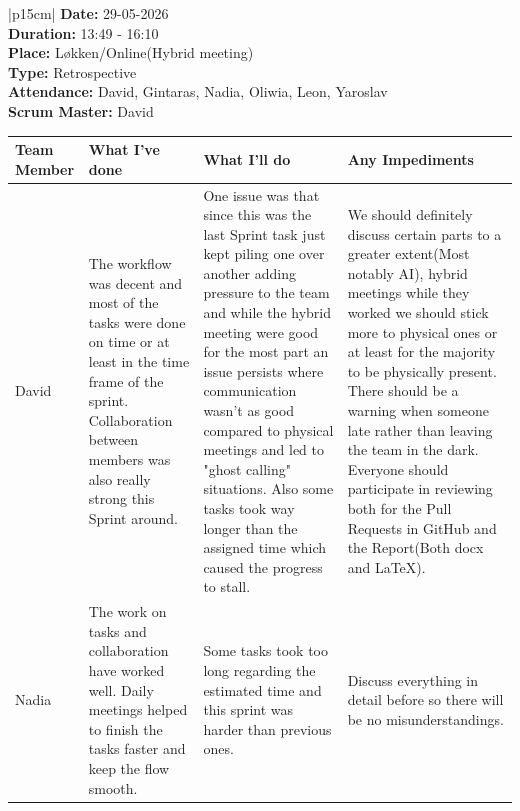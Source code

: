 \begin{table}[H]
    \centering
    \begin{tabular}{|p{15cm}|}   
        \hline
        \textbf{Date:}  29-05-2026 \\
        \textbf{Duration:}  13:49 - 16:10 \\
        \textbf{Place:}  Løkken/Online(Hybrid meeting) \\
        \textbf{Type:} Retrospective \\
        \textbf{Attendance:}  David, Gintaras, Nadia, Oliwia, Leon, Yaroslav\\
        \textbf{Scrum Master:}  David 
        \begin{table}[H]
            \begin{tabular}{|p{1.75cm}|p{4cm}|p{4cm}|p{4cm}|}
                \hline
                \cellcolor[HTML]{BFBFBF}  \textbf{Team Member} & \cellcolor[HTML]{BFBFBF}  \textbf{What I've done} & \cellcolor[HTML]{BFBFBF}  \textbf{What I'll do} & \cellcolor[HTML]{BFBFBF}  \textbf{Any Impediments}\\
                \hline
                \cellcolor[HTML]{d4d4d4} David & The workflow was decent and most of the tasks were done on time or at least in the time frame of the sprint. Collaboration between members was also really strong this Sprint around. & One issue was that since this was the last Sprint task just kept piling one over another adding pressure to the team and while the hybrid meeting were good for the most part an issue persists where communication wasn't as good compared to physical meetings and led to "ghost calling" situations. Also some tasks took way longer than the assigned time which caused the progress to stall. & We should definitely discuss certain parts to a greater extent(Most notably AI), hybrid meetings while they worked we should stick more to physical ones or at least for the majority to be physically present. There should be a warning when someone late rather than leaving the team in the dark. Everyone should participate in reviewing both for the Pull Requests in GitHub and the Report(Both docx and LaTeX). \\
                \hline
                \cellcolor[HTML]{d4d4d4} Nadia & The work on tasks and collaboration have worked well. Daily meetings helped to finish the tasks faster and keep the flow smooth.  & Some tasks took too long regarding the estimated time and this sprint was harder than previous ones. & Discuss everything in detail before so there will be no misunderstandings. \\
                \hline              
            \end{tabular}
        \end{table} \\
        \hline
    \end{tabular}
\end{table}

